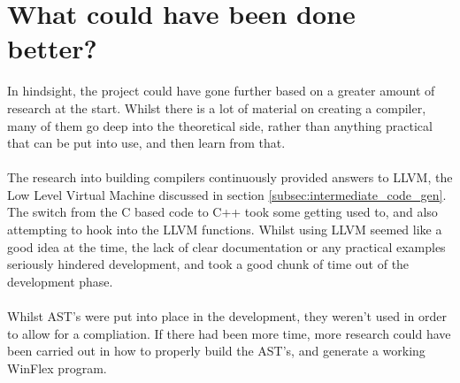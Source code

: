 \documentclass[12pt]{report}
\begin{document}
\section{What could have been done better?}\label{sec:con:better}
In hindsight, the project could have gone further based on a greater amount of research at the start.  Whilst there is a lot of material on creating a compiler, many of them go deep into the theoretical side, rather than anything practical that can be put into use, and then learn from that.\\
\\
The research into building compilers continuously provided answers to LLVM, the Low Level Virtual Machine discussed in section \ref{subsec:intermediate_code_gen}.  The switch from the C based code to C++ took some getting used to, and also attempting to hook into the LLVM functions.  Whilst using LLVM seemed like a good idea at the time, the lack of clear documentation or any practical examples seriously hindered development, and took a good chunk of time out of the development phase.
\\
\\
Whilst AST's were put into place in the development, they weren't used in order to allow for a compliation.  If there had been more time, more research could have been carried out in how to properly build the AST's, and generate a working WinFlex program.




\end{document}
